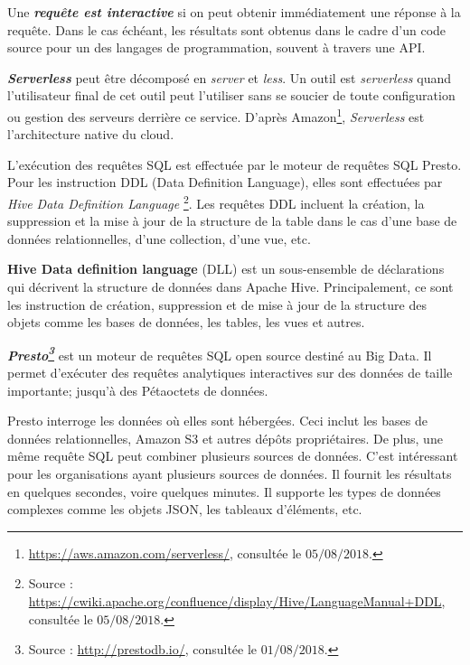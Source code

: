 \begin{tcolorbox}
	Une \textbf{\textit{requête est	interactive}} si on peut  obtenir immédiatement une réponse à la requête.  Dans le cas échéant, les résultats sont obtenus  dans le cadre d'un code source pour un des langages de programmation, souvent à travers une API.
\end{tcolorbox}

\begin{tcolorbox}
	\textbf{\textit{Serverless}} peut être décomposé en \textit{server} et \textit{less}. Un outil est \textit{serverless} quand l'utilisateur final de cet outil peut l'utiliser sans se soucier de toute configuration ou gestion des serveurs derrière ce service. D'après Amazon\footnote{\url{https://aws.amazon.com/serverless/}, consultée le  $05/08/2018$.},  \textit{Serverless} est l'architecture native du cloud.
\end{tcolorbox}

L'exécution des requêtes SQL est effectuée par le moteur de requêtes SQL Presto. Pour les instruction DDL (Data Definition Language), elles sont effectuées par  \textit{Hive Data Definition Language} \footnote{Source : \url{https://cwiki.apache.org/confluence/display/Hive/LanguageManual+DDL}, consultée le $05/08/2018$.}. Les requêtes DDL incluent la création, la suppression et la mise à jour de la structure de la table dans le cas d'une base de données relationnelles, d'une collection, d'une vue, etc. 

\begin{tcolorbox}
	\textbf{Hive Data definition language} (DLL) est un sous-ensemble de déclarations qui décrivent la structure de données dans Apache Hive.  Principalement, ce sont les instruction de création, suppression et de mise à jour de la structure des objets comme les bases de données, les tables, les vues et autres.
\end{tcolorbox}

\begin{tcolorbox}
	\textbf{\textit{Presto\footnote{Source : \url{http://prestodb.io/}, consultée le $01/08/2018$.} }} est un moteur de requêtes SQL open source destiné au Big Data. Il permet d'exécuter des requêtes analytiques interactives sur des données de taille importante; jusqu'à des Pétaoctets de données.
	
	Presto interroge les données où elles sont hébergées. Ceci inclut les bases de données relationnelles, Amazon S3 et autres dépôts propriétaires. De plus, une même requête SQL peut combiner plusieurs sources de données. C'est intéressant pour les organisations ayant plusieurs sources de données. Il fournit les résultats en quelques secondes, voire quelques minutes.  Il supporte les types de données complexes comme les objets JSON, les tableaux d'éléments, etc. 
\end{tcolorbox} 


